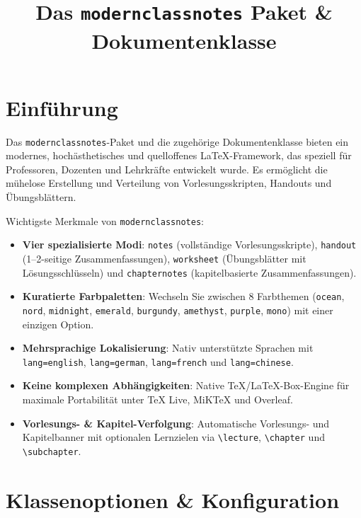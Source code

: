 \documentclass[mode=notes, palette=ocean, lang=german, fontsize=11pt]{modernclassnotes}
\title{Das \texttt{modernclassnotes} Paket \& Dokumentenklasse}
\begin{document}
\maketitle

\tableofcontents
\newpage

\section{Einführung}

Das \texttt{modernclassnotes}-Paket und die zugehörige Dokumentenklasse bieten ein modernes, hochästhetisches und quelloffenes LaTeX-Framework, das speziell für Professoren, Dozenten und Lehrkräfte entwickelt wurde. Es ermöglicht die mühelose Erstellung und Verteilung von Vorlesungsskripten, Handouts und Übungsblättern.

\begin{takeaways}
Wichtigste Merkmale von \texttt{modernclassnotes}:
\begin{itemize}
    \item \textbf{Vier spezialisierte Modi}: \texttt{notes} (vollständige Vorlesungsskripte), \texttt{handout} (1--2-seitige Zusammenfassungen), \texttt{worksheet} (Übungsblätter mit Lösungsschlüsseln) und \texttt{chapternotes} (kapitelbasierte Zusammenfassungen).
    \item \textbf{Kuratierte Farbpaletten}: Wechseln Sie zwischen 8 Farbthemen (\texttt{ocean}, \texttt{nord}, \texttt{midnight}, \texttt{emerald}, \texttt{burgundy}, \texttt{amethyst}, \texttt{purple}, \texttt{mono}) mit einer einzigen Option.
    \item \textbf{Mehrsprachige Lokalisierung}: Nativ unterstützte Sprachen mit \texttt{lang=english}, \texttt{lang=german}, \texttt{lang=french} und \texttt{lang=chinese}.
    \item \textbf{Keine komplexen Abhängigkeiten}: Native TeX/LaTeX-Box-Engine für maximale Portabilität unter TeX Live, MiKTeX und Overleaf.
    \item \textbf{Vorlesungs- \& Kapitel-Verfolgung}: Automatische Vorlesungs- und Kapitelbanner mit optionalen Lernzielen via \texttt{\textbackslash lecture}, \texttt{\textbackslash chapter} und \texttt{\textbackslash subchapter}.
\end{itemize}
\end{takeaways}

\section{Klassenoptionen \& Konfiguration}
\end{document}
